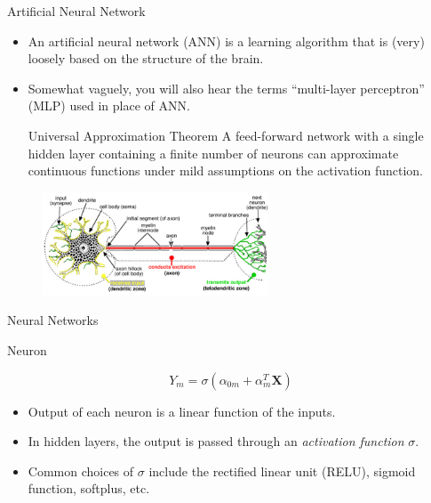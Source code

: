 \documentclass{beamer}
\let \vec \mathbf
\begin{document}
\begin{frame}{Artificial Neural Network}
\begin{itemize}
        \item An artificial neural network (ANN) is a learning algorithm that is (very) loosely based on the structure of the brain.
        \item Somewhat vaguely, you will also hear the terms ``multi-layer perceptron'' (MLP) used in place of ANN.
        \begin{block}{Universal Approximation Theorem\cite{csajiApproximationArtificialNeural}}
        A feed-forward network with a single hidden layer containing a finite number of neurons can approximate continuous functions under mild assumptions on the activation function. 
        \end{block}
\end{itemize}
\begin{figure}
        \centering
        \includegraphics[width=0.6\textwidth]{figures/neuron.jpg}
    \end{figure}
\end{frame}


\begin{frame}{Neural Networks}
    
\end{frame}


\begin{frame}{Neuron}
\begin{figure}
\end{figure}
\begin{equation*}
    Y_m = \sigma(\alpha_{0m} + \alpha_{m}^T \vec{X})
\end{equation*}
    \begin{itemize}
        \item Output of each neuron is a linear function of the inputs.
        \item In hidden layers, the output is passed through an \textit{activation function} $\sigma$.
        \item Common choices of $\sigma$ include the rectified linear unit (RELU), sigmoid function, softplus, etc.
    \end{itemize}
\end{frame}
\end{document}
